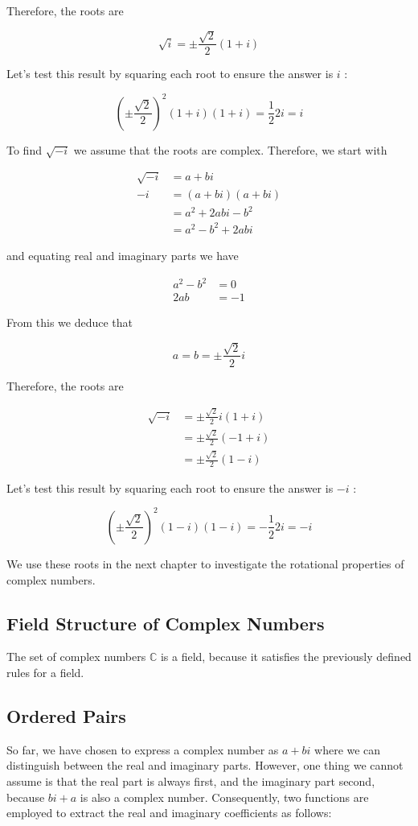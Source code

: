 \documentclass[10pt]{article}
\begin{document}
Therefore, the roots are

$$
\sqrt{i}= \pm \frac{\sqrt{2}}{2}(1+i)
$$

Let's test this result by squaring each root to ensure the answer is $i$ :

$$
\left( \pm \frac{\sqrt{2}}{2}\right)^{2}(1+i)(1+i)=\frac{1}{2} 2 i=i
$$

To find $\sqrt{-i}$ we assume that the roots are complex. Therefore, we start with

$$
\begin{aligned}
\sqrt{-i} & =a+b i \\
-i & =(a+b i)(a+b i) \\
& =a^{2}+2 a b i-b^{2} \\
& =a^{2}-b^{2}+2 a b i
\end{aligned}
$$

and equating real and imaginary parts we have

$$
\begin{aligned}
a^{2}-b^{2} & =0 \\
2 a b & =-1
\end{aligned}
$$

From this we deduce that

$$
a=b= \pm \frac{\sqrt{2}}{2} i
$$

Therefore, the roots are

$$
\begin{aligned}
\sqrt{-i} & = \pm \frac{\sqrt{2}}{2} i(1+i) \\
& = \pm \frac{\sqrt{2}}{2}(-1+i) \\
& = \pm \frac{\sqrt{2}}{2}(1-i)
\end{aligned}
$$

Let's test this result by squaring each root to ensure the answer is $-i$ :

$$
\left( \pm \frac{\sqrt{2}}{2}\right)^{2}(1-i)(1-i)=-\frac{1}{2} 2 i=-i
$$

We use these roots in the next chapter to investigate the rotational properties of complex numbers.

\subsection{Field Structure of Complex Numbers}
The set of complex numbers $\mathbb{C}$ is a field, because it satisfies the previously defined rules for a field.

\subsection{Ordered Pairs}
So far, we have chosen to express a complex number as $a+b i$ where we can distinguish between the real and imaginary parts. However, one thing we cannot assume is that the real part is always first, and the imaginary part second, because $b i+a$ is also a complex number. Consequently, two functions are employed to extract the real and imaginary coefficients as follows:
\end{document}
